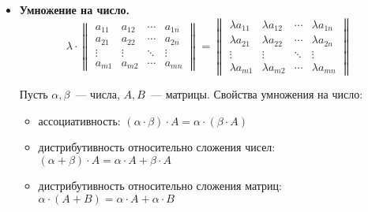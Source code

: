 \begin{itemize}
	\item\textbf{Умножение на число.}
	\begin{equation*}
	\lambda \cdot
	\begin{Vmatrix}
	a_{11} & a_{12} & \cdots & a_{1n} \\ 
	a_{21} & a_{22} & \cdots & a_{2n} \\ 
	\vdots & \vdots & \ddots & \vdots \\ 
	a_{m1} & a_{m2} & \cdots & a_{mn}
	\end{Vmatrix} =
	\begin{Vmatrix}
	\lambda a_{11} & \lambda a_{12} & \cdots & \lambda a_{1n} \\ 
	\lambda a_{21} & \lambda a_{22} & \cdots & \lambda a_{2n} \\ 
	\vdots & \vdots & \ddots & \vdots \\ 
	\lambda a_{m1} & \lambda a_{m2} & \cdots & \lambda a_{mn}
	\end{Vmatrix}
	\end{equation*}
	
	Пусть $\alpha, \beta$~--- числа, $A, B$~--- матрицы. Свойства умножения на число:
	\begin{itemize}
		\item ассоциативность:
		$(\alpha \cdot \beta) \cdot A = \alpha \cdot (\beta \cdot A)$
		\item дистрибутивность относительно сложения чисел:
		$(\alpha + \beta) \cdot A = \alpha \cdot A + \beta \cdot A$
		\item дистрибутивность относительно сложения матриц:
		$\alpha \cdot (A + B) = \alpha \cdot A + \alpha \cdot B$
	\end{itemize}
	

\end{itemize}
